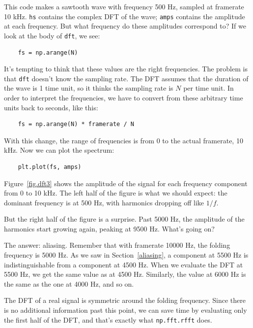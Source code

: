 \documentclass[12pt]{book}
\begin{document}
This code makes a sawtooth wave with frequency 500 Hz, sampled at
framerate 10 kHz.  {\tt hs} contains the complex DFT of the wave;
{\tt amps} contains the amplitude at each frequency.  But what
frequency do these amplitudes correspond to?  If we look at the
body of {\tt dft}, we see:

\begin{verbatim}
    fs = np.arange(N)
\end{verbatim}

It's tempting to think that these values are the right frequencies.
The problem is that {\tt dft} doesn't know the sampling rate.  The DFT
assumes that the duration of the wave is 1 time unit, so it thinks the
sampling rate is $N$ per time unit.  In order to interpret the
frequencies, we have to convert from these arbitrary time units back
to seconds, like this:

\begin{verbatim}
    fs = np.arange(N) * framerate / N
\end{verbatim}

With this change, the range of frequencies is from 0 to the actual
framerate, 10 kHz.  Now we can plot the spectrum:

\begin{verbatim}
    plt.plot(fs, amps)
\end{verbatim}

Figure~\ref{fig.dft3} shows the amplitude of the signal for each
frequency component from 0 to 10 kHz.  The left half of the figure
is what we should expect: the dominant frequency is at 500 Hz, with
harmonics dropping off like $1/f$.

But the right half of the figure is a surprise.  Past 5000 Hz, the
amplitude of the harmonics start growing again, peaking at 9500 Hz.
What's going on?

The answer: aliasing.  Remember that with framerate 10000 Hz, the
folding frequency is 5000 Hz.  As we saw in Section~\ref{aliasing},
a component at 5500 Hz is indistinguishable from a component
at 4500 Hz.  When we evaluate the DFT at 5500 Hz, we get the same
value as at 4500 Hz.  Similarly, the value at 6000 Hz is the same
as the one at 4000 Hz, and so on.

The DFT of a real signal is symmetric around the folding frequency.
Since there is no additional information past this point, we can
save time by evaluating only the first half of the DFT,
and that's exactly what {\tt np.fft.rfft} does.
\end{document}
